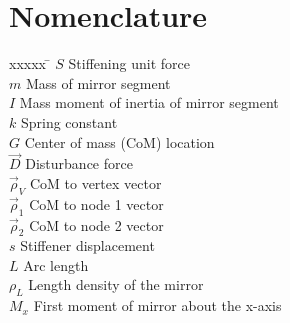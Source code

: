 \section*{Nomenclature}

\begin{tabbing}
	xxxxx \= \kill%
	$S$ \> Stiffening unit force \\
	$m$ \> Mass of mirror segment \\
	$I$ \> Mass moment of inertia of mirror segment \\
	$k$ \> Spring constant \\
	$G$ \> Center of mass (CoM) location \\
	$\vec{D}$ \> Disturbance force \\
	$\vec{\rho}_V$ \> CoM to vertex vector \\
	$\vec{\rho}_1$ \> CoM to node 1 vector \\
	$\vec{\rho}_2$ \> CoM to node 2 vector \\
	$s$ \> Stiffener displacement \\
	$L$ \> Arc length \\
	$\rho_L$ \> Length density of the mirror \\
	$M_x$ \> First moment of mirror about the x-axis \\
	
 \end{tabbing}
 